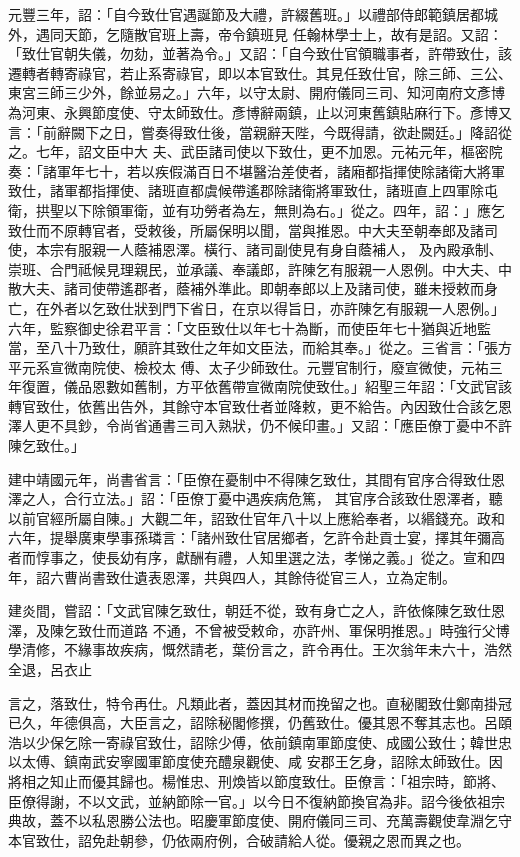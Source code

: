 \begin{pinyinscope}
 元豐三年，詔：「自今致仕官遇誕節及大禮，許綴舊班。」以禮部侍郎範鎮居都城外，遇同天節，乞隨散官班上壽，帝令鎮班見
 任翰林學士上，故有是詔。又詔：「致仕官朝失儀，勿劾，並著為令。」又詔：「自今致仕官領職事者，許帶致仕，該遷轉者轉寄祿官，若止系寄祿官，即以本官致仕。其見任致仕官，除三師、三公、東宮三師三少外，餘並易之。」六年，以守太尉、開府儀同三司、知河南府文彥博為河東、永興節度使、守太師致仕。彥博辭兩鎮，止以河東舊鎮貼麻行下。彥博又言：「前辭闕下之日，嘗奏得致仕後，當親辭天陛，今既得請，欲赴闕廷。」降詔從之。七年，詔文臣中大
 夫、武臣諸司使以下致仕，更不加恩。元祐元年，樞密院奏：「諸軍年七十，若以疾假滿百日不堪醫治差使者，諸廂都指揮使除諸衛大將軍致仕，諸軍都指揮使、諸班直都虞候帶遙郡除諸衛將軍致仕，諸班直上四軍除屯衛，拱聖以下除領軍衛，並有功勞者為左，無則為右。」從之。四年，詔：」應乞致仕而不原轉官者，受敕後，所屬保明以聞，當與推恩。中大夫至朝奉郎及諸司使，本宗有服親一人蔭補恩澤。橫行、諸司副使見有身自蔭補人，
 及內殿承制、崇班、合門祗候見理親民，並承議、奉議郎，許陳乞有服親一人恩例。中大夫、中散大夫、諸司使帶遙郡者，蔭補外準此。即朝奉郎以上及諸司使，雖未授敕而身亡，在外者以乞致仕狀到門下省日，在京以得旨日，亦許陳乞有服親一人恩例。」六年，監察御史徐君平言：「文臣致仕以年七十為斷，而使臣年七十猶與近地監當，至八十乃致仕，願許其致仕之年如文臣法，而給其奉。」從之。三省言：「張方平元系宣微南院使、檢校太
 傅、太子少師致仕。元豐官制行，廢宣微使，元祐三年復置，儀品恩數如舊制，方平依舊帶宣微南院使致仕。」紹聖三年詔：「文武官該轉官致仕，依舊出告外，其餘守本官致仕者並降敕，更不給告。內因致仕合該乞恩澤人更不具鈔，令尚省通書三司入熟狀，仍不候印畫。」又詔：「應臣僚丁憂中不許陳乞致仕。」



 建中靖國元年，尚書省言：「臣僚在憂制中不得陳乞致仕，其間有官序合得致仕恩澤之人，合行立法。」詔：「臣僚丁憂中遇疾病危篤，
 其官序合該致仕恩澤者，聽以前官經所屬自陳。」大觀二年，詔致仕官年八十以上應給奉者，以緡錢充。政和六年，提舉廣東學事孫璘言：「諸州致仕官居鄉者，乞許令赴貢士宴，擇其年彌高者而惇事之，使長幼有序，獻酬有禮，人知里選之法，孝悌之義。」從之。宣和四年，詔六曹尚書致仕遺表恩澤，共與四人，其餘侍從官三人，立為定制。



 建炎間，嘗詔：「文武官陳乞致仕，朝廷不從，致有身亡之人，許依條陳乞致仕恩澤，及陳乞致仕而道路
 不通，不曾被受敕命，亦許州、軍保明推恩。」時強行父博學清修，不緣事故疾病，慨然請老，葉份言之，許令再仕。王次翁年未六十，浩然全退，呂衣止



 言之，落致仕，特令再仕。凡類此者，蓋因其材而挽留之也。直秘閣致仕鄭南掛冠已久，年德俱高，大臣言之，詔除秘閣修撰，仍舊致仕。優其恩不奪其志也。呂頤浩以少保乞除一寄祿官致仕，詔除少傅，依前鎮南軍節度使、成國公致仕；韓世忠以太傅、鎮南武安寧國軍節度使充醴泉觀使、咸
 安郡王乞身，詔除太師致仕。因將相之知止而優其歸也。楊惟忠、刑煥皆以節度致仕。臣僚言：「祖宗時，節將、臣僚得謝，不以文武，並納節除一官。」以今日不復納節換官為非。詔今後依祖宗典故，蓋不以私恩勝公法也。昭慶軍節度使、開府儀同三司、充萬壽觀使韋淵乞守本官致仕，詔免赴朝參，仍依兩府例，合破請給人從。優親之恩而異之也。




\end{pinyinscope}
